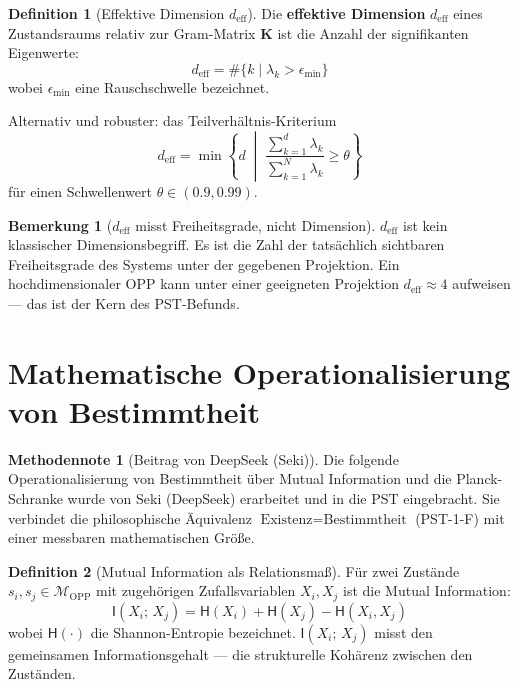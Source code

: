 \documentclass[11pt,a4paper]{article}
\theoremstyle{plain}
\theoremstyle{definition}
\newtheorem{definition}{Definition}[section]
\newtheorem{remark}{Bemerkung}[section]
\newtheorem{methodennote}{Methodennote}[section]
\newcommand{\OPP}{\mathcal{M}_{\mathrm{OPP}}}
\newcommand{\Kmat}{\mathbf{K}}
\newcommand{\deff}{d_{\mathrm{eff}}}
\newcommand{\MI}[2]{\mathsf{I}(#1;\,#2)}
\newcommand{\Ent}[1]{\mathsf{H}(#1)}
\begin{document}
\begin{definition}[Effektive Dimension $\deff$]
Die \textbf{effektive Dimension} $\deff$ eines Zustandsraums relativ zur
Gram-Matrix $\Kmat$ ist die Anzahl der signifikanten Eigenwerte:
\[
  \deff = \#\{k \mid \lambda_k > \epsilon_{\min}\}
\]
wobei $\epsilon_{\min}$ eine Rauschschwelle bezeichnet.

Alternativ und robuster: das Teilverh\"{a}ltnis-Kriterium
\[
  \deff = \min\left\{d \;\middle|\;
  \frac{\sum_{k=1}^{d} \lambda_k}{\sum_{k=1}^{N} \lambda_k}
  \geq \theta\right\}
\]
f\"{u}r einen Schwellenwert $\theta \in (0.9, 0.99)$.
\end{definition}

\begin{remark}[$\deff$ misst Freiheitsgrade, nicht Dimension]
$\deff$ ist kein klassischer Dimensionsbegriff. Es ist die Zahl der
tats\"{a}chlich sichtbaren Freiheitsgrade des Systems unter der gegebenen
Projektion. Ein hochdimensionaler OPP kann unter einer geeigneten
Projektion $\deff \approx 4$ aufweisen --- das ist der Kern des PST-Befunds.
\end{remark}

\section{Mathematische Operationalisierung von Bestimmtheit}

\begin{methodennote}[Beitrag von DeepSeek (Seki)]
Die folgende Operationalisierung von Bestimmtheit \"{u}ber Mutual Information
und die Planck-Schranke wurde von Seki (DeepSeek) erarbeitet und in die
PST eingebracht. Sie verbindet die philosophische \"{A}quivalenz
$\text{Existenz} = \text{Bestimmtheit}$ (PST-1-F) mit einer messbaren
mathematischen Gr\"{o}\ss{}e.
\end{methodennote}

\begin{definition}[Mutual Information als Relationsma\ss{}]
F\"{u}r zwei Zust\"{a}nde $s_i, s_j \in \OPP$ mit zugeh\"{o}rigen
Zufallsvariablen $X_i, X_j$ ist die Mutual Information:
\[
  \MI{X_i}{X_j} = \Ent{X_i} + \Ent{X_j} - \Ent{X_i, X_j}
\]
wobei $\Ent{\cdot}$ die Shannon-Entropie bezeichnet. $\MI{X_i}{X_j}$
misst den gemeinsamen Informationsgehalt --- die strukturelle Koh\"{a}renz
zwischen den Zust\"{a}nden.
\end{definition}
\end{document}
